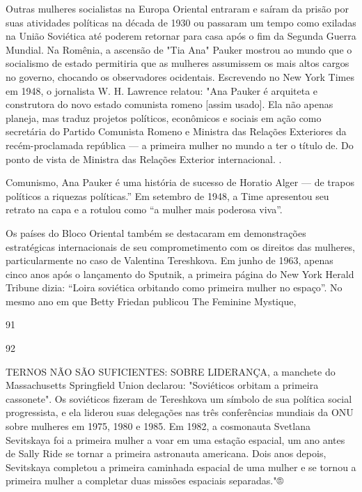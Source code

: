  \par 
Outras mulheres socialistas na Europa Oriental entraram e saíram da prisão por suas atividades políticas na década de 1930 ou passaram um tempo como exiladas na União Soviética até poderem retornar para casa após o fim da Segunda Guerra Mundial. Na Romênia, a ascensão de "Tia Ana" Pauker mostrou ao mundo que o socialismo de estado permitiria que as mulheres assumissem os mais altos cargos no governo, chocando os observadores ocidentais. Escrevendo no New York Times em 1948, o jornalista W. H. Lawrence relatou: "Ana Pauker é arquiteta e construtora do novo estado comunista romeno [assim usado]. Ela não apenas planeja, mas traduz projetos políticos, econômicos e sociais em ação como secretária do Partido Comunista Romeno e Ministra das Relações Exteriores da recém-proclamada república — a primeira mulher no mundo a ter o título de. Do ponto de vista de Ministra das Relações Exterior internacional. .
 \par 
Comunismo, Ana Pauker é uma história de sucesso de Horatio Alger — de trapos políticos a riquezas políticas.” Em setembro de 1948, a Time apresentou seu retrato na capa e a rotulou como “a mulher mais poderosa viva”.
 \par 
Os países do Bloco Oriental também se destacaram em demonstrações estratégicas internacionais de seu comprometimento com os direitos das mulheres, particularmente no caso de Valentina Tereshkova. Em junho de 1963, apenas cinco anos após o lançamento do Sputnik, a primeira página do New York Herald Tribune dizia: “Loira soviética orbitando como primeira mulher no espaço”. No mesmo ano em que Betty Friedan publicou The Feminine Mystique,
 \par 
91
 \par 
92
 \par 
TERNOS NÃO SÃO SUFICIENTES: SOBRE LIDERANÇA, a manchete do Massachusetts Springfield Union declarou: "Soviéticos orbitam a primeira cassonete". Os soviéticos fizeram de Tereshkova um símbolo de sua política social progressista, e ela liderou suas delegações nas três conferências mundiais da ONU sobre mulheres em 1975, 1980 e 1985. Em 1982, a cosmonauta Svetlana Sevitskaya foi a primeira mulher a voar em uma estação espacial, um ano antes de Sally Ride se tornar a primeira astronauta americana. Dois anos depois, Sevitskaya completou a primeira caminhada espacial de uma mulher e se tornou a primeira mulher a completar duas missões espaciais separadas."®
 \par 

